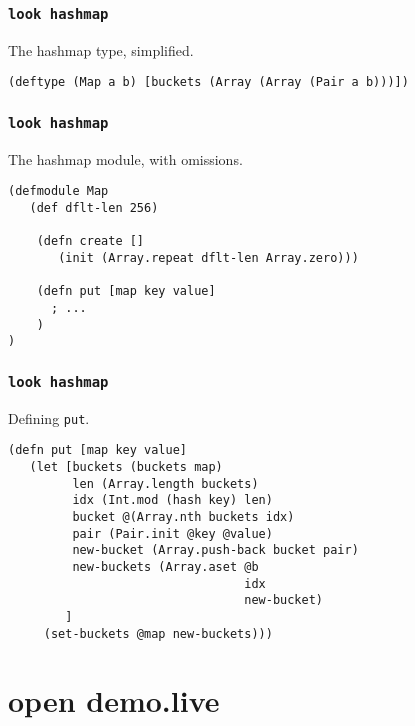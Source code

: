 \documentclass{beamer}
\begin{document}
  \begin{frame}[fragile]
    \frametitle{\texttt{look hashmap}}
    \begin{listing}[H]
      \caption{The hashmap type, simplified.}
      \begin{verbatim}
(deftype (Map a b) [buckets (Array (Array (Pair a b)))])
      \end{verbatim}
    \end{listing}
  \end{frame}
  \begin{frame}[fragile]
    \frametitle{\texttt{look hashmap}}
    \begin{listing}[H]
      \caption{The hashmap module, with omissions.}
      \begin{verbatim}
(defmodule Map
   (def dflt-len 256)

    (defn create []
       (init (Array.repeat dflt-len Array.zero)))

    (defn put [map key value]
      ; ...
    )
)
      \end{verbatim}
    \end{listing}
  \end{frame}
  \begin{frame}[fragile]
    \frametitle{\texttt{look hashmap}}
    \begin{listing}[H]
      \caption{Defining \texttt{put}.}
      \begin{verbatim}
(defn put [map key value]
   (let [buckets (buckets map)
         len (Array.length buckets)
         idx (Int.mod (hash key) len)
         bucket @(Array.nth buckets idx)
         pair (Pair.init @key @value)
         new-bucket (Array.push-back bucket pair)
         new-buckets (Array.aset @b
                                 idx
                                 new-bucket)
        ]
     (set-buckets @map new-buckets)))
      \end{verbatim}
    \end{listing}
  \end{frame}
  \section{open demo.live}
\end{document}
